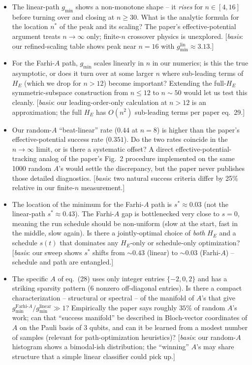 \documentclass[11pt]{article}
\begin{document}
\begin{itemize}
\item[\textbf{Q1}] The linear-path $g_{\min}$ shows a non-monotone shape --
    it \emph{rises} for $n \in [4, 16]$ before turning over and closing at
    $n \ge 30$. What is the analytic formula for the location $n^*$ of the
    peak and its scaling? The paper's effective-potential argument treats
    $n\to\infty$ only; finite-$n$ crossover physics is unexplored.
    [\emph{basis}: our refined-scaling table shows peak near $n = 16$ with
    $g_{\min}^{\text{lin}} \approx 3.13$.]
\item[\textbf{Q2}] For the Farhi-$A$ path, $g_{\min}$ scales linearly in $n$
    in our numerics; is this the true asymptotic, or does it turn over at
    some larger $n$ where sub-leading terms of $H_E$ (which we drop for
    $n > 12$) become important? Extending the full-$H_E$ symmetric-subspace
    construction from $n \le 12$ to $n \sim 50$ would let us test this
    cleanly.
    [\emph{basis}: our leading-order-only calculation at $n > 12$ is an
    approximation; the full $H_E$ has $O(n^2)$ sub-leading terms per paper eq.\ 29.]
\item[\textbf{Q3}] Our random-$A$ ``beat-linear'' rate ($0.44$ at $n=8$) is
    higher than the paper's effective-potential success rate ($0.351$).
    Do the two rates coincide in the $n \to \infty$ limit, or is there a
    systematic offset? A direct effective-potential-tracking analog of the
    paper's Fig.\ 2 procedure implemented on the same 1000 random $A$'s
    would settle the discrepancy, but the paper never publishes those
    detailed diagnostics.
    [\emph{basis}: two natural success criteria differ by 25\% relative in
    our finite-$n$ measurement.]
\item[\textbf{Q4}] The location of the minimum for the Farhi-$A$ path is
    $s^* \approx 0.03$ (not the linear-path $s^* \approx 0.43$). The
    Farhi-$A$ gap is bottlenecked very close to $s = 0$, meaning the run
    schedule should be non-uniform (slow at the start, fast in the middle,
    slow again). Is there a jointly-optimal choice of \emph{both} $H_E$ and
    a schedule $s(t)$ that dominates any $H_E$-only or schedule-only optimization?
    [\emph{basis}: our sweep shows $s^*$ shifts from $\sim 0.43$ (linear) to
    $\sim 0.03$ (Farhi-$A$) -- schedule and path are entangled.]
\item[\textbf{Q5}] The specific $A$ of eq.\ (28) uses only integer entries $\{-2, 0, 2\}$
    and has a striking sparsity pattern (6 nonzero off-diagonal entries).
    Is there a compact characterization -- structural or spectral -- of the
    manifold of $A$'s that give $g_{\min}^{\text{Farhi-}A}/g_{\min}^{\text{linear}}
    \gg 1$? Empirically the paper says roughly $35\%$ of random $A$'s work;
    can that ``success manifold'' be described in Bloch-vector coordinates
    of $A$ on the Pauli basis of 3 qubits, and can it be learned from a
    modest number of samples (relevant for path-optimization heuristics)?
    [\emph{basis}: our random-$A$ histogram shows a bimodal-ish distribution;
    the ``winning'' $A$'s may share structure that a simple linear classifier
    could pick up.]
\end{itemize}
\end{document}
